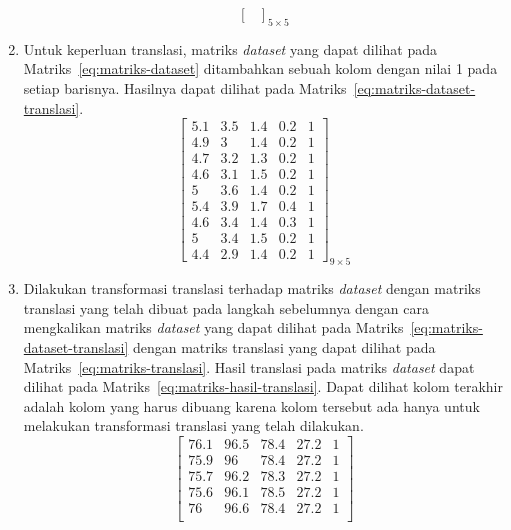 \begin{enumerate}
\begin{equation}
\begin{bmatrix}
        \end{bmatrix}_{5\times 5}
    \end{equation}
    \item Untuk keperluan translasi, matriks \textit{dataset} yang dapat dilihat pada Matriks~\ref{eq:matriks-dataset} ditambahkan sebuah kolom dengan nilai 1 pada setiap barisnya. Hasilnya dapat dilihat pada Matriks~\ref{eq:matriks-dataset-translasi}.
    \begin{equation}\label{eq:matriks-dataset-translasi}
        \begin{bmatrix}
            5.1		&		3.5		&		1.4		&		0.2		&		1 \\
            4.9		&		3		&		1.4		&		0.2		&		1 \\
            4.7		&		3.2		&		1.3		&		0.2		&		1 \\
            4.6		&		3.1		&		1.5		&		0.2		&		1 \\
            5		&		3.6		&		1.4		&		0.2		&		1 \\
            5.4		&		3.9		&		1.7		&		0.4		&		1 \\
            4.6		&		3.4		&		1.4		&		0.3		&		1 \\
            5		&		3.4		&		1.5		&		0.2		&		1 \\
            4.4		&		2.9		&		1.4		&		0.2		&		1
        \end{bmatrix}_{9\times 5}
    \end{equation}
    \item Dilakukan transformasi translasi terhadap matriks \textit{dataset} dengan matriks translasi yang telah dibuat pada langkah sebelumnya dengan cara mengkalikan matriks \textit{dataset} yang dapat dilihat pada Matriks~\ref{eq:matriks-dataset-translasi} dengan matriks translasi yang dapat dilihat pada Matriks~\ref{eq:matriks-translasi}. Hasil translasi pada matriks \textit{dataset} dapat dilihat pada Matriks~\ref{eq:matriks-hasil-translasi}. Dapat dilihat kolom terakhir adalah kolom yang harus dibuang karena kolom tersebut ada hanya untuk melakukan transformasi translasi yang telah dilakukan.
    \begin{equation}\label{eq:matriks-hasil-translasi}
        \begin{bmatrix}
            76.1&96.5&78.4&27.2&1 \\
            75.9&96&78.4&27.2&1 \\
            75.7&96.2&78.3&27.2&1 \\
            75.6&96.1&78.5&27.2&1 \\
            76&96.6&78.4&27.2&1 \\

\end{bmatrix}
\end{equation}
\end{enumerate}
